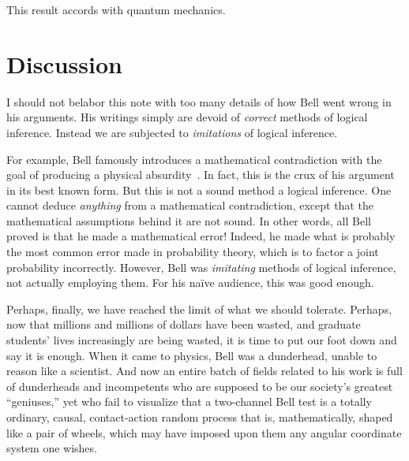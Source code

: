 \documentclass[9pt,technote]{IEEEtran}
\begin{document}
This result accords with quantum mechanics.

\section{Discussion}

I should not belabor this note with too many details of how Bell went
wrong in his arguments. His writings simply are devoid of
{\em{correct}} methods of logical inference. Instead we are subjected
to {\em{imitations}} of logical inference.

For example, Bell famously introduces a mathematical contradiction
with the goal of producing a physical
absurdity~\cite{bertlmann:manuscript}. In fact, this is the crux of
his argument in its best known form. But this is not a sound method a
logical inference. One cannot deduce {\em{anything}} from a
mathematical contradiction, except that the mathematical assumptions
behind it are not sound. In other words, all Bell proved is that he
made a mathematical error! Indeed, he made what is probably the most
common error made in probability theory, which is to factor a joint
probability incorrectly. However, Bell was {\em{imitating}} methods of
logical inference, not actually employing them. For his naïve
audience, this was good enough.

Perhaps, finally, we have reached the limit of what we should
tolerate. Perhaps, now that millions and millions of dollars have been
wasted, and graduate students' lives increasingly are being wasted, it
is time to put our foot down and say it is enough. When it came to
physics, Bell was a dunderhead, unable to reason like a scientist. And
now an entire batch of fields related to his work is full of
dunderheads and incompetents who are supposed to be our society’s
greatest ``geniuses,'' yet who fail to visualize that a two-channel
Bell test is a totally ordinary, causal, contact-action random process
that is, mathematically, shaped like a pair of wheels, which may have
imposed upon them any angular coordinate system one wishes.
\end{document}
